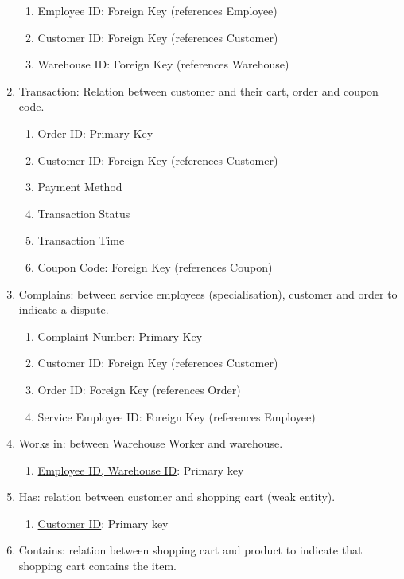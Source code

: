 \documentclass[12pt]{report}
\begin{document}
\begin{enumerate}
\begin{enumerate}
                \item Employee ID: Foreign Key (references Employee)
                \item Customer ID: Foreign Key (references Customer)
                \item Warehouse ID: Foreign Key (references Warehouse)
            \end{enumerate}
            \item Transaction: Relation between customer and their cart, order and coupon code.
            \begin{enumerate}
                \item \underline{Order ID}: Primary Key
                \item Customer ID: Foreign Key (references Customer)
                \item Payment Method
                \item Transaction Status
                \item Transaction Time
                \item Coupon Code: Foreign Key (references Coupon)
            \end{enumerate}
            \item Complains: between service employees (specialisation), customer and order to indicate a dispute.
            \begin{enumerate}
                \item \underline {Complaint Number}: Primary Key
                \item Customer ID: Foreign Key (references Customer)
                \item Order ID: Foreign Key (references Order)
                \item Service Employee ID: Foreign Key (references Employee)
            \end{enumerate}
	\item Works in: between Warehouse Worker and warehouse.
	\begin{enumerate}
				\item \underline{Employee ID, Warehouse ID}: Primary key
			\end{enumerate}
	\item Has: relation between customer and shopping cart (weak entity).
			\begin{enumerate}
				\item \underline{Customer ID}: Primary key
			\end{enumerate}
	\item Contains: relation between shopping cart and product to indicate that shopping cart contains the item.

\end{enumerate}
\end{document}
